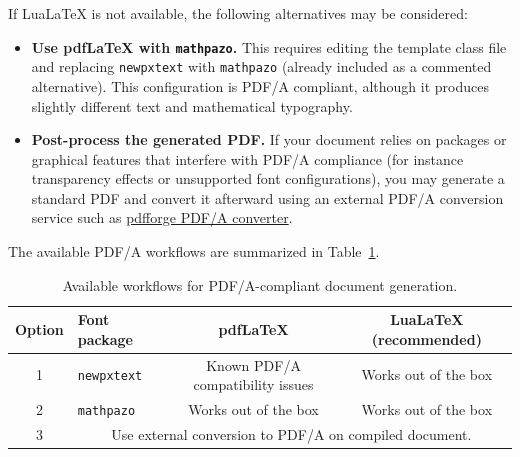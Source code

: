 If LuaLaTeX is not available, the following alternatives may be considered:

\begin{itemize}
    \item \textbf{Use pdfLaTeX with \texttt{mathpazo}.}  
    This requires editing the template class file and replacing \verb|newpxtext| with \verb|mathpazo| (already included as a commented alternative). This configuration is PDF/A compliant, although it produces slightly different text and mathematical typography.

    \item \textbf{Post-process the generated PDF.}  
    If your document relies on packages or graphical features that interfere with PDF/A compliance (for instance transparency effects or unsupported font configurations), you may generate a standard PDF and convert it afterward using an external PDF/A conversion service such as
    \href{https://www.pdfforge.org/online/en/pdf-to-pdfa}{pdfforge PDF/A converter}.
\end{itemize}

The available PDF/A workflows are summarized in Table~\ref{tab:pdfa}.

\begin{table}[h!]
\small
\centering
\def\arraystretch{1.4}
\begin{tabular}{c|p{2.8cm}|c|c}\hline
\textbf{Option} & \textbf{Font package} & \textbf{pdfLaTeX} & \textbf{LuaLaTeX (recommended)} \\
\hline\hline
1 & \verb|newpxtext| 
& Known PDF/A compatibility issues 
& Works out of the box \\
\hline
2 & \verb|mathpazo| 
& Works out of the box 
& Works out of the box \\
\hline
3 & \multicolumn{3}{c}{Use external conversion to PDF/A on compiled document.}\\
\hline
\end{tabular}
\caption{\label{tab:pdfa}Available workflows for PDF/A-compliant document generation.}
\end{table}
